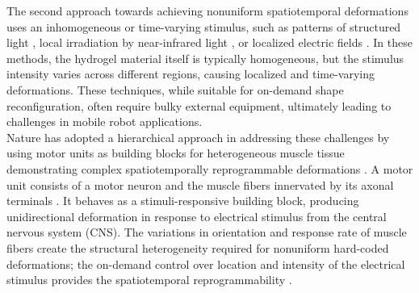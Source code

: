 The second approach towards achieving nonuniform spatiotemporal deformations uses an inhomogeneous or time-varying stimulus, such as patterns of structured light , local irradiation by near-infrared light , or localized electric fields . In these methods, the hydrogel material itself is typically homogeneous, but the stimulus intensity varies across different regions, causing localized and time-varying deformations. These techniques, while suitable for on-demand shape reconfiguration, often require bulky external equipment, ultimately leading to challenges in mobile robot applications.\\

Nature has adopted a hierarchical approach in addressing these challenges by using motor units as building blocks for heterogeneous muscle tissue demonstrating complex spatiotemporally reprogrammable deformations  . A motor unit consists of a motor neuron and the muscle fibers innervated by its axonal terminals .
It behaves as a stimuli-responsive building block, producing unidirectional deformation in response to electrical stimulus from the central nervous system (CNS). 
 The variations in orientation   and response rate  of muscle fibers create the structural heterogeneity  required for nonuniform hard-coded deformations; the on-demand control over location and intensity of the electrical stimulus provides the spatiotemporal reprogrammability .\\
 

